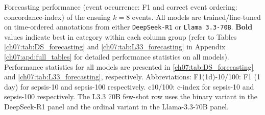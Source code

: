 \begin{table}[htbp]
\caption{Forecasting performance (event occurrence: F1 and correct event ordering: concordance-index) of the ensuing $k=8$ events. All models are trained/fine-tuned on time-ordered annotations from either \texttt{DeepSeek-R1} or \texttt{Llama 3.3-70B}. \textbf{Bold} values indicate best in category within each column group (refer to Tables \ref{ch07:tab:DS_forecasting} and \ref{ch07:tab:L33_forecasting} in Appendix \ref{ch07:apd:full_tables} for detailed performance statistics on all models). Performance statistics for all models are presented in \ref{ch07:tab:DS_forecasting} and \ref{ch07:tab:L33_forecasting}, respectively. Abbreviations: F1(1d)-10/100: F1 (1 day) for sepsis-10 and sepsis-100 respectively. c10/100: c-index for sepsis-10 and sepsis-100 respectively. The L3.3 70B few-shot row uses the binary variant in the DeepSeek-R1 panel and the ordinal variant in the Llama-3.3-70B panel.
}
\ChSevenTableBodyStart
\begin{ChSevenFloatBody}


\end{ChSevenFloatBody}
\end{table}
